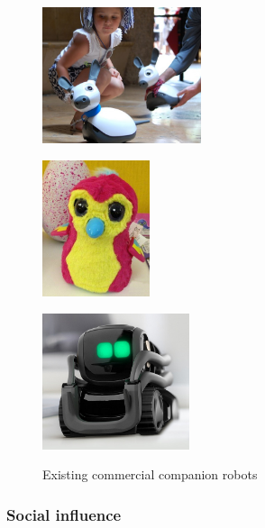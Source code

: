 \documentclass[11pt]{article}
\begin{document}
\begin{figure}[!htbp]
    \begin{minipage}[b]{.3\linewidth}
        \centering\includegraphics[height=4cm]{figs/miro.jpg}
        \label{fig:miro}
    \end{minipage}%
    \hspace{0.1cm}
    \begin{minipage}[b]{.3\linewidth}
        \centering
        \includegraphics[height=4cm]{figs/hatchnimals.jpg}
        \label{fig:hatchimals}
    \end{minipage}%
    \hspace{0.1cm}
    \begin{minipage}[b]{.3\linewidth}
        \centering
        \includegraphics[height=4cm]{figs/anki-vector.jpg}
        \label{fig:vector}
    \end{minipage}
    \caption{Existing commercial companion robots}\label{fig:commercial-robots}
\end{figure}

\subsubsection{Social influence}
\end{document}
